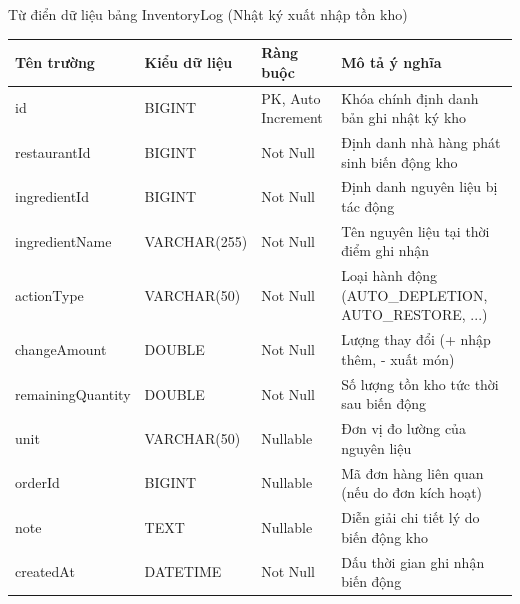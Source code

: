 \documentclass{uetgraduation}
\begin{document}
\begin{table}[!htbp]{Từ điển dữ liệu bảng InventoryLog (Nhật ký xuất nhập tồn kho)}
\centering
\small
\begin{tabularx}{\textwidth}{|>{\raggedright\arraybackslash}p{2.8cm}|>{\raggedright\arraybackslash}p{3.0cm}|>{\raggedright\arraybackslash}p{3.5cm}|>{\raggedright\arraybackslash}X|}
\hline
\textbf{Tên trường} & \textbf{Kiểu dữ liệu} & \textbf{Ràng buộc} & \textbf{Mô tả ý nghĩa} \\ \hline
id & BIGINT & PK, Auto Increment & Khóa chính định danh bản ghi nhật ký kho \\ \hline
restaurantId & BIGINT & Not Null & Định danh nhà hàng phát sinh biến động kho \\ \hline
ingredientId & BIGINT & Not Null & Định danh nguyên liệu bị tác động \\ \hline
ingredientName & VARCHAR(255) & Not Null & Tên nguyên liệu tại thời điểm ghi nhận \\ \hline
actionType & VARCHAR(50) & Not Null & Loại hành động (AUTO\_DEPLETION, AUTO\_RESTORE, ...) \\ \hline
changeAmount & DOUBLE & Not Null & Lượng thay đổi (+ nhập thêm, - xuất món) \\ \hline
remainingQuantity & DOUBLE & Not Null & Số lượng tồn kho tức thời sau biến động \\ \hline
unit & VARCHAR(50) & Nullable & Đơn vị đo lường của nguyên liệu \\ \hline
orderId & BIGINT & Nullable & Mã đơn hàng liên quan (nếu do đơn kích hoạt) \\ \hline
note & TEXT & Nullable & Diễn giải chi tiết lý do biến động kho \\ \hline
createdAt & DATETIME & Not Null & Dấu thời gian ghi nhận biến động \\ \hline
\end{tabularx}
\end{table}
\end{document}
